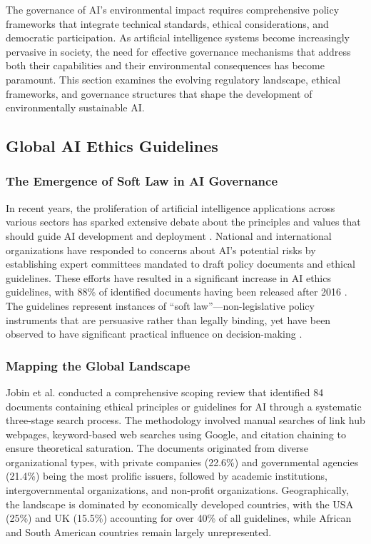 \documentclass[twoside]{ai_ethics_class}
\begin{document}
The governance of AI's environmental impact requires comprehensive policy frameworks that integrate technical standards, ethical considerations, and democratic participation.
As artificial intelligence systems become increasingly pervasive in society, the need for effective governance mechanisms that address both their capabilities and their environmental consequences has become paramount.
This section examines the evolving regulatory landscape, ethical frameworks, and governance structures that shape the development of environmentally sustainable AI.

\subsection{Global AI Ethics Guidelines}

\subsubsection{The Emergence of Soft Law in AI Governance}

In recent years, the proliferation of artificial intelligence applications across various sectors has sparked extensive debate about the principles and values that should guide AI development and deployment \cite{jobin2019global}.
National and international organizations have responded to concerns about AI's potential risks by establishing expert committees mandated to draft policy documents and ethical guidelines.
These efforts have resulted in a significant increase in AI ethics guidelines, with 88\% of identified documents having been released after 2016 \cite{jobin2019global}.
The guidelines represent instances of ``soft law''—non-legislative policy instruments that are persuasive rather than legally binding, yet have been observed to have significant practical influence on decision-making \cite{jobin2019global}.

\subsubsection{Mapping the Global Landscape}

Jobin et al. \cite{jobin2019global} conducted a comprehensive scoping review that identified 84 documents containing ethical principles or guidelines for AI through a systematic three-stage search process.
The methodology involved manual searches of link hub webpages, keyword-based web searches using Google, and citation chaining to ensure theoretical saturation.
The documents originated from diverse organizational types, with private companies (22.6\%) and governmental agencies (21.4\%) being the most prolific issuers, followed by academic institutions, intergovernmental organizations, and non-profit organizations.
Geographically, the landscape is dominated by economically developed countries, with the USA (25\%) and UK (15.5\%) accounting for over 40\% of all guidelines, while African and South American countries remain largely unrepresented.
\end{document}
